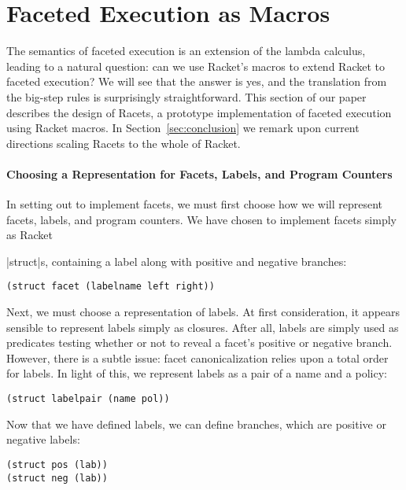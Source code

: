 \documentclass[review=true,acmlarge]{acmart}
\newcommand*{\SavedLstInline}{}
\DeclareRobustCommand*{\lstinline}{%
  \ifmmode
    \let\SavedBGroup\bgroup
    \def\bgroup{%
      \let\bgroup\SavedBGroup
      \hbox\bgroup
    }%
  \fi
  \SavedLstInline
}
\begin{document}
\section{Faceted Execution as Macros}

The semantics of faceted execution is an extension of the lambda
calculus, leading to a natural question: can we use Racket's macros to
extend Racket to faceted execution? We will see that the answer is
yes, and the translation from the big-step rules is surprisingly
straightforward. This section of our paper describes the design of
Racets, a prototype implementation of faceted execution using Racket
macros. In Section~\ref{sec:conclusion} we remark upon current
directions scaling Racets to the whole of Racket.

\paragraph*{Choosing a Representation for Facets, Labels, and Program Counters}

In setting out to implement facets, we must first choose how we will
represent facets, labels, and program counters. We have chosen to
implement facets simply as Racket \lstinline|struct|s, containing a
label along with positive and negative branches:

\begin{lstlisting}[language=Racket,escapechar=|,name=racets]
(struct facet (labelname left right))
\end{lstlisting}

Next, we must choose a representation of labels. At first
consideration, it appears sensible to represent labels simply as
closures. After all, labels are simply used as predicates testing
whether or not to reveal a facet's positive or negative
branch. However, there is a subtle issue: facet canonicalization
relies upon a total order for labels. In light of this, we represent
labels as a pair of a name and a policy:

\begin{lstlisting}[language=Racket,escapechar=|,name=racets]
(struct labelpair (name pol))
\end{lstlisting}

Now that we have defined labels, we can define branches, which are
positive or negative labels:

\begin{lstlisting}[language=Racket,escapechar=|,name=racets]
(struct pos (lab))
(struct neg (lab))
\end{lstlisting}
\end{document}
